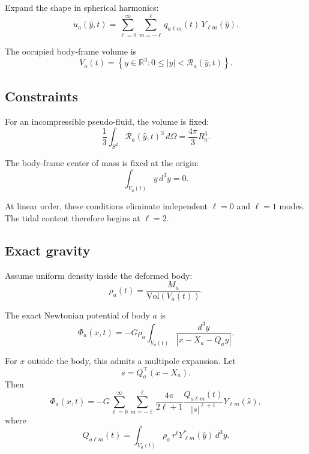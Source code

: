 \documentclass[journal, a4paper]{IEEEtran}
\begin{document}
Expand the shape in spherical harmonics:
\begin{equation}
u_a(\hat y,t)
=
\sum_{\ell=0}^{\infty}
\sum_{m=-\ell}^{\ell}
q_{a\ell m}(t)\,Y_{\ell m}(\hat y).
\label{eq:u-spherical}
\end{equation}

The occupied body-frame volume is
\begin{equation}
V_a(t)
=
\left\{
y\in\mathbb{R}^3:
0\le |y|<\mathcal{R}_a(\hat y,t)
\right\}.
\label{eq:Va}
\end{equation}

\subsection{Constraints}

For an incompressible pseudo-fluid, the volume is fixed:
\begin{equation}
\frac{1}{3}\int_{S^2}
\mathcal{R}_a(\hat y,t)^3\,d\Omega
=
\frac{4\pi}{3}R_a^3.
\label{eq:volume}
\end{equation}

The body-frame center of mass is fixed at the origin:
\begin{equation}
\int_{V_a(t)} y\,d^3y = 0.
\label{eq:center}
\end{equation}

At linear order, these conditions eliminate independent $\ell=0$ and
$\ell=1$ modes. The tidal content therefore begins at $\ell=2$.

\subsection{Exact gravity}

Assume uniform density inside the deformed body:
\begin{equation}
\rho_a(t)=\frac{M_a}{\mathrm{Vol}(V_a(t))}.
\end{equation}

The exact Newtonian potential of body $a$ is
\begin{equation}
\Phi_a(x,t)
=
-G\rho_a
\int_{V_a(t)}
\frac{d^3y}{|x-X_a-Q_a y|}.
\label{eq:exactPhi}
\end{equation}

For $x$ outside the body, this admits a multipole expansion. Let
\begin{equation}
s = Q_a^{\top}(x-X_a).
\end{equation}
Then
\begin{equation}
\Phi_a(x,t)
=
-G
\sum_{\ell=0}^{\infty}
\sum_{m=-\ell}^{\ell}
\frac{4\pi}{2\ell+1}
\frac{Q_{a\ell m}(t)}{|s|^{\ell+1}}
Y_{\ell m}(\hat s),
\label{eq:multipolePhi}
\end{equation}
where
\begin{equation}
Q_{a\ell m}(t)
=
\int_{V_a(t)}
\rho_a\,
r^\ell
Y_{\ell m}^{*}(\hat y)\,d^3y.
\label{eq:exactQlm}
\end{equation}
\end{document}
